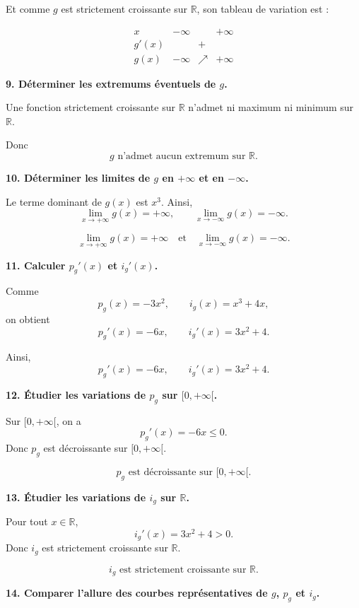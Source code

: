 \documentclass[11pt,a4paper]{article}
\newcommand{\R}{\mathbb{R}}
\begin{document}
Et comme \(g\) est strictement croissante sur \(\R\), son tableau de variation est :

\[
\begin{array}{c|ccc}
x & -\infty & & +\infty\\
\hline
g'(x) & & + & \\
\hline
g(x) & -\infty & \nearrow & +\infty
\end{array}
\]

\bigskip

\textbf{9. Déterminer les extremums éventuels de \(g\).}

Une fonction strictement croissante sur \(\R\) n'admet ni maximum ni minimum sur \(\R\).

Donc
\[
\boxed{g \text{ n'admet aucun extremum sur } \R.}
\]

\bigskip

\textbf{10. Déterminer les limites de \(g\) en \(+\infty\) et en \(-\infty\).}

Le terme dominant de \(g(x)\) est \(x^3\). Ainsi,
\[
\lim_{x\to +\infty} g(x)=+\infty,
\qquad
\lim_{x\to -\infty} g(x)=-\infty.
\]

\[
\boxed{\lim_{x\to +\infty} g(x)=+\infty \quad \text{et} \quad \lim_{x\to -\infty} g(x)=-\infty.}
\]

\bigskip

\textbf{11. Calculer \(p_g'(x)\) et \(i_g'(x)\).}

Comme
\[
p_g(x)=-3x^2,
\qquad
i_g(x)=x^3+4x,
\]
on obtient
\[
p_g'(x)=-6x,
\qquad
i_g'(x)=3x^2+4.
\]

Ainsi,
\[
\boxed{p_g'(x)=-6x,\qquad i_g'(x)=3x^2+4.}
\]

\bigskip

\textbf{12. Étudier les variations de \(p_g\) sur \([0,+\infty[\).}

Sur \([0,+\infty[\), on a
\[
p_g'(x)=-6x\le 0.
\]
Donc \(p_g\) est décroissante sur \([0,+\infty[\).

\[
\boxed{p_g \text{ est décroissante sur } [0,+\infty[.}
\]

\bigskip

\textbf{13. Étudier les variations de \(i_g\) sur \(\R\).}

Pour tout \(x\in\R\),
\[
i_g'(x)=3x^2+4>0.
\]
Donc \(i_g\) est strictement croissante sur \(\R\).

\[
\boxed{i_g \text{ est strictement croissante sur } \R.}
\]

\bigskip

\textbf{14. Comparer l’allure des courbes représentatives de $g$, $p_g$ et $i_g$.}
\end{document}
